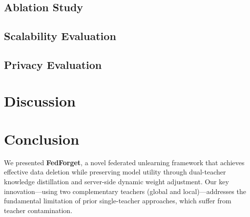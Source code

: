 \documentclass{article}
\begin{document}

\subsection{Ablation Study}
\label{sec:ablation}


\subsection{Scalability Evaluation}
\label{sec:scalability}


\subsection{Privacy Evaluation}
\label{sec:privacy}



\section{Discussion}
\label{sec:discussion}



\section{Conclusion}
\label{sec:conclusion}

We presented \textbf{FedForget}, a novel federated unlearning framework that achieves effective data deletion while preserving model utility through dual-teacher knowledge distillation and server-side dynamic weight adjustment. Our key innovation—using two complementary teachers (global and local)—addresses the fundamental limitation of prior single-teacher approaches, which suffer from teacher contamination.
\end{document}
